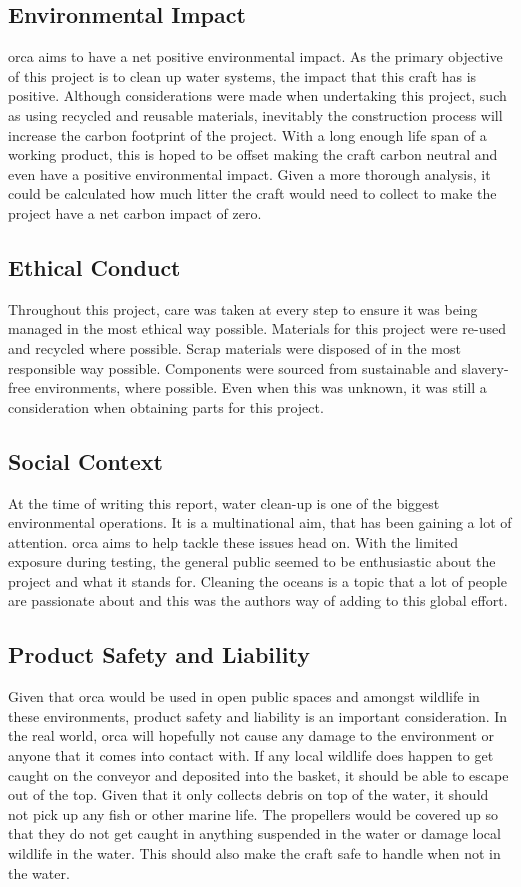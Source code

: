 \documentclass [12pt]{article}
\begin{document}
\subsection{Environmental Impact}
\gls{orca} aims to have a net positive environmental impact. As the primary objective of this project is to clean up water systems, the impact that this craft has is positive. Although considerations were made when undertaking this project, such as using recycled and reusable materials, inevitably the construction process will increase the carbon footprint of the project. With a long enough life span of a working product, this is hoped to be offset making the craft carbon neutral and even have a positive environmental impact.  Given a more thorough analysis, it could be calculated how much litter the craft would need to collect to make the project have a net carbon impact of zero.  

\subsection{Ethical Conduct}
Throughout this project, care was taken at every step to ensure it was being managed in the most ethical way possible. Materials for this project were re-used and recycled where possible. Scrap materials were disposed of in the most responsible way possible. Components were sourced from sustainable and slavery-free environments, where possible. Even when this was unknown, it was still a consideration when obtaining parts for this project.  

\subsection{Social Context}
At the time of writing this report, water clean-up is one of the biggest environmental operations. It is a multinational aim, that has been gaining a lot of attention. \gls{orca} aims to help tackle these issues head on. With the limited exposure during testing, the general public seemed to be enthusiastic about the project and what it stands for. Cleaning the oceans is a topic that a lot of people are passionate about and this was the authors way of adding to this global effort. 

\subsection{Product Safety and Liability}
Given that \gls{orca} would be used in open public spaces and amongst wildlife in these environments, product safety and liability is an important consideration. In the real world, \gls{orca} will hopefully not cause any damage to the environment or anyone that it comes into contact with. If any local wildlife does happen to get caught on the conveyor and deposited into the basket, it should be able to escape out of the top. Given that it only collects debris on top of the water, it should not pick up any fish or other marine life. The propellers would be covered up so that they do not get caught in anything suspended in the water or damage local wildlife in the water. This should also make the craft safe to handle when not in the water. 
\end{document}

